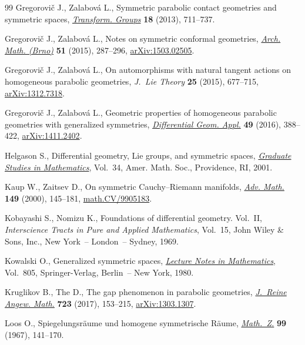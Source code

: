\documentclass[10pt,a4paper]{amsart}
\numberwithin{equation}{section}
\begin{document}
\begin{thebibliography}{99}
Gregorovi\v{c} J., Zalabov\'a L., Symmetric parabolic contact geometries and
 symmetric spaces, \href{https://doi.org/10.1007/s00031-013-9231-z}{\textit{Transform. Groups}} \textbf{18} (2013), 711--737.

Gregorovi\v{c} J., Zalabov\'a L., Notes on symmetric conformal geometries,
 \href{https://doi.org/10.5817/AM2015-5-287}{\textit{Arch. Math. (Brno)}} \textbf{51} (2015), 287--296,
 \href{http://arxiv.org/abs/1503.02505}{arXiv:1503.02505}.

Gregorovi\v{c} J., Zalabov\'a L., On automorphisms with natural tangent actions
 on homogeneous parabolic geometries, \textit{J.~Lie Theory} \textbf{25}
 (2015), 677--715, \href{http://arxiv.org/abs/1312.7318}{arXiv:1312.7318}.

Gregorovi\v{c} J., Zalabov\'a L., Geometric properties of homogeneous parabolic
 geometries with generalized symmetries, \href{https://doi.org/10.1016/j.difgeo.2016.09.008}{\textit{Differential Geom. Appl.}}
 \textbf{49} (2016), 388--422, \href{http://arxiv.org/abs/1411.2402}{arXiv:1411.2402}.

Helgason S., Dif\/ferential geometry, {L}ie groups, and symmetric spaces,
 \href{https://doi.org/10.1090/gsm/034}{\textit{Graduate Studies in Mathematics}}, Vol.~34, Amer. Math. Soc.,
 Providence, RI, 2001.

Kaup W., Zaitsev D., On symmetric {C}auchy--{R}iemann manifolds, \href{https://doi.org/10.1006/aima.1999.1863}{\textit{Adv.
 Math.}} \textbf{149} (2000), 145--181, \href{http://arxiv.org/abs/math.CV/9905183}{math.CV/9905183}.

Kobayashi S., Nomizu K., Foundations of dif\/ferential geometry. {V}ol.~{II},
 \textit{Interscience Tracts in Pure and Applied Mathematics}, Vol.~15, John
 Wiley \& Sons, Inc., New York~-- London~-- Sydney, 1969.

Kowalski O., Generalized symmetric spaces, \href{https://doi.org/10.1007/BFb0103324}{\textit{Lecture Notes in
 Mathematics}}, Vol.~805, Springer-Verlag, Berlin~-- New York, 1980.

Kruglikov B., The D., The gap phenomenon in parabolic geometries,
 \href{https://doi.org/10.1515/crelle-2014-0072}{\textit{J.~Reine Angew. Math.}} \textbf{723} (2017), 153--215,
 \href{http://arxiv.org/abs/1303.1307}{arXiv:1303.1307}.

Loos O., Spiegelungsr\"aume und homogene symmetrische {R}\"aume,
 \href{https://doi.org/10.1007/BF01123745}{\textit{Math.~Z.}} \textbf{99} (1967), 141--170.


\end{thebibliography}
\end{document}

